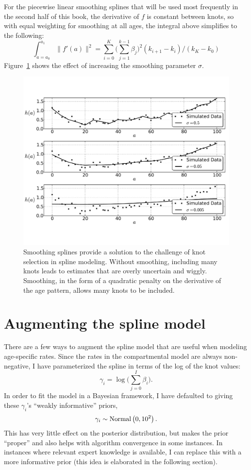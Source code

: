 For the piecewise linear smoothing splines that will be used most
frequently in the second half of this book, the derivative of $f$ is
constant between knots, so with equal weighting for smoothing at all
ages, the integral above simplifies to the following:
\[
\int _{a=a_0} ^{a_1} \| f'(a) \|^2 = \sum_{i=0} ^K \bigg(\sum_{j=1} ^{k-1} \beta_j\bigg)^2(k_{i+1}-k_i) / (k_K - k_0)
\]
Figure~\ref{smoothing-splines} shows the effect of increasing the
smoothing parameter $\sigma$.

\begin{figure}[h]
\begin{center}
\includegraphics[width=\textwidth]{smoothing-splines.pdf}
\caption{Smoothing splines provide a solution to the challenge of knot
  selection in spline modeling.  Without smoothing, including many
  knots leads to estimates that are overly uncertain and wiggly.
  Smoothing, in the form of a quadratic penalty on the derivative of
  the age pattern, allows many knots to be included.}
\label{smoothing-splines}
\end{center}
\end{figure}


\section{Augmenting the spline model}
There are a few ways to augment the spline model that are useful when
modeling age-specific rates. Since the rates in the compartmental
model are always non-negative, I have parameterized the spline in
terms of the log of the knot values:
\[
\gamma_i = \log\bigg(\sum_{j=0}^I \beta_i\bigg).
\]
In order to fit the model in a Bayesian framework, I have defaulted to
giving these $\gamma_i$'s ``weakly informative'' priors,
\[
\gamma_i \sim \operatorname{Normal}\left(0, 10^2\right).
\]
This has very little effect on the posterior distribution, but makes
the prior ``proper'' and also helps with algorithm convergence in
some instances. In instances where relevant expert knowledge is
available, I can replace this with a more informative prior (this idea
is elaborated in the following section).

